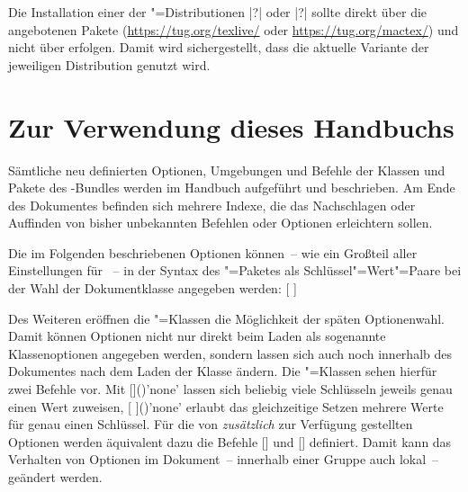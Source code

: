 Die Installation einer der "=Distributionen 
|?| oder |?| 
sollte direkt über die angebotenen Pakete 
(\url{https://tug.org/texlive/} oder \url{https://tug.org/mactex/}) und nicht 
über  erfolgen. Damit wird sichergestellt, dass die 
aktuelle Variante der jeweiligen Distribution genutzt wird.



\section{Zur Verwendung dieses Handbuchs}
Sämtliche neu definierten Optionen, Umgebungen und Befehle der Klassen und 
Pakete des \TUDScript-Bundles werden im Handbuch aufgeführt und beschrieben. Am 
Ende des Dokumentes befinden sich mehrere Indexe, die das Nachschlagen oder 
Auffinden von bisher unbekannten Befehlen oder Optionen erleichtern sollen.

Die im Folgenden beschriebenen Optionen können~-- wie ein Großteil aller 
Einstellungen für \KOMAScript~-- in der Syntax des "=Paketes 
als Schlüssel"=Wert"=Paare bei der Wahl der Dokumentklasse angegeben werden:
[%
]

Des Weiteren eröffnen die \KOMAScript"=Klassen die Möglichkeit der späten 
Optionenwahl. Damit können Optionen nicht nur direkt beim Laden als sogenannte 
Klassenoptionen angegeben werden, sondern lassen sich auch noch innerhalb des 
Dokumentes nach dem Laden der Klasse ändern. Die \KOMAScript"=Klassen sehen 
hierfür zwei Befehle vor. Mit 
[]()'none'
lassen sich beliebig viele Schlüsseln jeweils genau einen Wert zuweisen, 
[%
]()'none'
erlaubt das gleichzeitige Setzen mehrere Werte für genau einen Schlüssel. 
Für die von \TUDScript \emph{zusätzlich} zur Verfügung gestellten Optionen
werden äquivalent dazu die Befehle []
und [] definiert. 
Damit kann das Verhalten von Optionen im Dokument~-- innerhalb einer Gruppe 
auch lokal~-- geändert werden.

